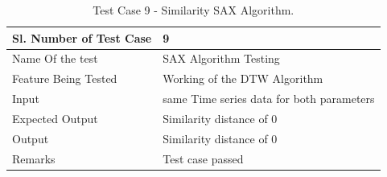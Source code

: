 \documentclass[12pt,a4paper]{report}
\begin{document}
\begin{table}
    \begin{tabular}{|l|l|}
    \hline
    Sl. Number of Test Case & 9                            \\ \hline
    Name Of the test        & SAX Algorithm Testing        \\ \hline
    Feature Being Tested    & Working of the DTW Algorithm \\ \hline
    Input                   & same Time series data for both parameters\\ \hline
    Expected Output         & Similarity distance of 0 \\ \hline
    Output                  & Similarity distance of 0 \\ \hline
    Remarks                 & Test case passed              \\ \hline
    \end{tabular}
    \caption {Test Case 9 - Similarity SAX Algorithm.}
\end{table}
\end{document}
